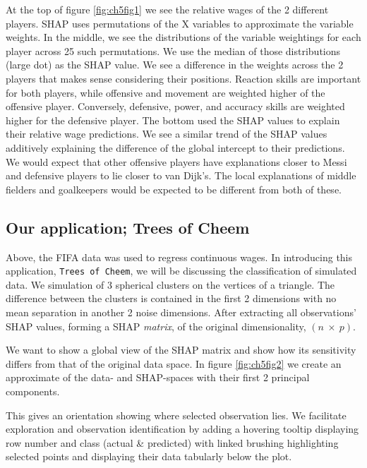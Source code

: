\documentclass{template/monashthesis}
\begin{document}
At the top of figure \ref{fig:ch5fig1} we see the relative wages of the 2 different players. SHAP uses permutations of the X variables to approximate the variable weights. In the middle, we see the distributions of the variable weightings for each player across 25 such permutations. We use the median of those distributions (large dot) as the SHAP value. We see a difference in the weights across the 2 players that makes sense considering their positions. Reaction skills are important for both players, while offensive and movement are weighted higher of the offensive player. Conversely, defensive, power, and accuracy skills are weighted higher for the defensive player. The bottom used the SHAP values to explain their relative wage predictions. We see a similar trend of the SHAP values additively explaining the difference of the global intercept to their predictions. We would expect that other offensive players have explanations closer to Messi and defensive players to lie closer to van Dijk's. The local explanations of middle fielders and goalkeepers would be expected to be different from both of these.

\hypertarget{our-application-trees-of-cheem}{%
\subsection{Our application; Trees of Cheem}\label{our-application-trees-of-cheem}}

Above, the FIFA data was used to regress continuous wages. In introducing this application, \texttt{Trees\ of\ Cheem}, we will be discussing the classification of simulated data. We simulation of 3 spherical clusters on the vertices of a triangle. The difference between the clusters is contained in the first 2 dimensions with no mean separation in another 2 noise dimensions. After extracting all observations' SHAP values, forming a SHAP \emph{matrix}, of the original dimensionality, \((n~\times~p)\).

We want to show a global view of the SHAP matrix and show how its sensitivity differs from that of the original data space. In figure \ref{fig:ch5fig2} we create an approximate of the data- and SHAP-spaces with their first 2 principal components.

This gives an orientation showing where selected observation lies. We facilitate exploration and observation identification by adding a hovering tooltip displaying row number and class (actual \& predicted) with linked brushing highlighting selected points and displaying their data tabularly below the plot.
\end{document}
